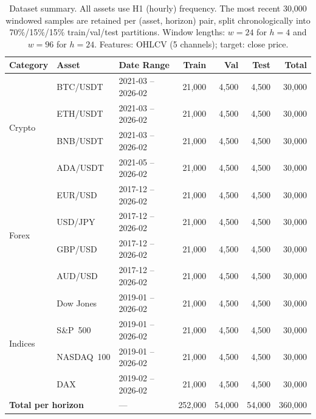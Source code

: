 \begin{table}[htbp]
  \centering
  \caption{Dataset summary.  All assets use H1 (hourly) frequency.  The most
    recent 30{,}000 windowed samples are retained per (asset, horizon) pair,
    split chronologically into 70\%/15\%/15\% train/val/test partitions.
    Window lengths: $w=24$ for $h=4$ and $w=96$ for $h=24$.  Features: OHLCV
    (5 channels); target: close price.}
  \label{tab:dataset_summary}
  \setlength{\tabcolsep}{6pt}%
  \begin{tabular}{%
    l%
    l%
    l%
    r%
    r%
    r%
    r%
  }
    \toprule
    \textbf{Category} & \textbf{Asset} & \textbf{Date Range}
      & \textbf{Train} & \textbf{Val} & \textbf{Test} & \textbf{Total} \\
    \midrule
    \multirow{4}{*}{Crypto}
      & BTC/USDT  & 2021-03 -- 2026-02 & 21{,}000 & 4{,}500 & 4{,}500 & 30{,}000 \\
      & ETH/USDT  & 2021-03 -- 2026-02 & 21{,}000 & 4{,}500 & 4{,}500 & 30{,}000 \\
      & BNB/USDT  & 2021-03 -- 2026-02 & 21{,}000 & 4{,}500 & 4{,}500 & 30{,}000 \\
      & ADA/USDT  & 2021-05 -- 2026-02 & 21{,}000 & 4{,}500 & 4{,}500 & 30{,}000 \\
    \midrule
    \multirow{4}{*}{Forex}
      & EUR/USD   & 2017-12 -- 2026-02 & 21{,}000 & 4{,}500 & 4{,}500 & 30{,}000 \\
      & USD/JPY   & 2017-12 -- 2026-02 & 21{,}000 & 4{,}500 & 4{,}500 & 30{,}000 \\
      & GBP/USD   & 2017-12 -- 2026-02 & 21{,}000 & 4{,}500 & 4{,}500 & 30{,}000 \\
      & AUD/USD   & 2017-12 -- 2026-02 & 21{,}000 & 4{,}500 & 4{,}500 & 30{,}000 \\
    \midrule
    \multirow{4}{*}{Indices}
      & Dow Jones   & 2019-01 -- 2026-02 & 21{,}000 & 4{,}500 & 4{,}500 & 30{,}000 \\
      & S\&P~500    & 2019-01 -- 2026-02 & 21{,}000 & 4{,}500 & 4{,}500 & 30{,}000 \\
      & NASDAQ~100  & 2019-01 -- 2026-02 & 21{,}000 & 4{,}500 & 4{,}500 & 30{,}000 \\
      & DAX         & 2019-02 -- 2026-02 & 21{,}000 & 4{,}500 & 4{,}500 & 30{,}000 \\
    \midrule
    \multicolumn{2}{l}{\textbf{Total per horizon}} & ---
      & 252{,}000 & 54{,}000 & 54{,}000 & 360{,}000 \\
    \bottomrule
  \end{tabular}
\end{table}

